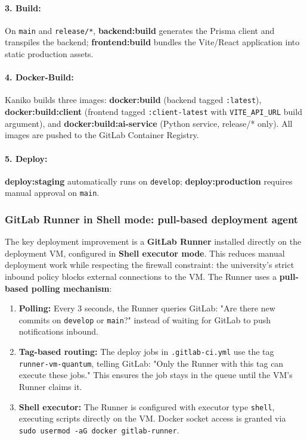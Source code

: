 \documentclass[11pt,a4paper]{article}
\begin{document}
\paragraph{3. Build:} On \texttt{main} and \texttt{release/*}, \textbf{backend:build} generates the Prisma client and transpiles the backend; \textbf{frontend:build} bundles the Vite/React application into static production assets.

\paragraph{4. Docker-Build:} Kaniko builds three images: \textbf{docker:build} (backend tagged \texttt{:latest}), \textbf{docker:build:client} (frontend tagged \texttt{:client-latest} with \texttt{VITE\_API\_URL} build argument), and \textbf{docker:build:ai-service} (Python service, release/* only). All images are pushed to the GitLab Container Registry.

\paragraph{5. Deploy:} \textbf{deploy:staging} automatically runs on \texttt{develop}; \textbf{deploy:production} requires manual approval on \texttt{main}.

\subsubsection{GitLab Runner in Shell mode: pull-based deployment agent}

The key deployment improvement is a \textbf{GitLab Runner} installed directly on the deployment VM, configured in \textbf{Shell executor mode}. This reduces manual deployment work while respecting the firewall constraint: the university's strict inbound policy blocks external connections to the VM. The Runner uses a \textbf{pull-based polling mechanism}:

\begin{enumerate}
\item \textbf{Polling:} Every 3 seconds, the Runner queries GitLab: "Are there new commits on \texttt{develop} or \texttt{main}?" instead of waiting for GitLab to push notifications inbound.
\item \textbf{Tag-based routing:} The deploy jobs in \texttt{.gitlab-ci.yml} use the tag \texttt{runner-vm-quantum}, telling GitLab: "Only the Runner with this tag can execute these jobs." This ensures the job stays in the queue until the VM's Runner claims it.
\item \textbf{Shell executor:} The Runner is configured with executor type \texttt{shell}, executing scripts directly on the VM. Docker socket access is granted via \texttt{sudo usermod -aG docker gitlab-runner}.
\end{enumerate}
\end{document}
